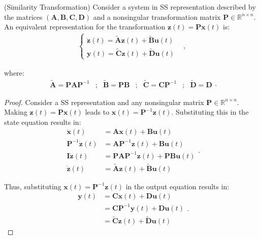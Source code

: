 \documentclass[a4paper,11pt]{book}
\numberwithin{figure}{chapter}
\numberwithin{equation}{chapter}
\numberwithin{table}{chapter}
\newtheorem{theorem}{Theorem}[chapter]
\theoremstyle{definition}
\newcounter{boxed-theorem}
\newenvironment{boxed-theorem}[1]
{\colorlet{shadecolor}{pastelBlue2!5} \begin{shaded} \begin{theorem}{#1}}
{\end{theorem} \end{shaded}}
\newcounter{boxed-lemma}
\newcounter{boxed-definition}
\newcounter{boxed-example}
\begin{document}
\begin{boxed-theorem}{(Similarity Transformation)}
    Consider a system in SS representation described by the matrices $(\bm{A}, \bm{B}, \bm{C}, \bm{D})$ and a nonsingular transformation matrix $\bm{P} \in \mathbb{R}^{n \times n}$. An equivalent representation for the transformation $\bm{z}(t) = \bm{P} \bm{x}(t)$ is:
    \begin{align}
    \begin{cases}
        \dot{\bm{z}}(t) = \tilde{\bm{A}} \bm{z}(t) + \tilde{\bm{B}} \bm{u}(t) & \\
        \bm{y}(t) = \tilde{\bm{C}} \bm{z}(t) + \tilde{\bm{D}} \bm{u}(t)
    \end{cases} 
    ,\end{align}
    
    \noindent where:
    \begin{equation}
        \begin{matrix}
            \tilde{\bm{A}} = \bm{P} \bm{A} \bm{P}^{-1} &; & \tilde{\bm{B}} = \bm{P} \bm{B} &; & \tilde{\bm{C}} = \bm{C} \bm{P}^{-1} &; & \tilde{\bm{D}} = \bm{D}
        \end{matrix}
    .\end{equation}
\end{boxed-theorem}

\begin{proof}
    Consider a SS representation and any nonsingular matrix $\bm{P} \in \mathbb{R}^{n \times n}$. Making $\bm{z}(t) = \bm{P} \bm{x}(t)$ leads to $\bm{x}(t) = \bm{P}^{-1} \bm{z}(t)$. Substituting this in the state equation results in:
    \begin{equation}
    \begin{split}
        \dot{\bm{x}}(t) &= \bm{A} \bm{x}(t) + \bm{B} \bm{u}(t) \\
        \bm{P}^{-1} \dot{\bm{z}}(t) &= \bm{A} \bm{P}^{-1} \bm{z}(t) + \bm{B} \bm{u}(t) \\
        \bm{I} \dot{\bm{z}}(t) &= \bm{P} \bm{A} \bm{P}^{-1} \bm{z}(t) + \bm{P} \bm{B} \bm{u}(t) \\
        \dot{\bm{z}}(t) &= \tilde{\bm{A}} \bm{z}(t) + \tilde{\bm{B}} \bm{u}(t)
    \end{split}
    .\end{equation}
    
    Thus, substituting $\bm{x}(t) = \bm{P}^{-1} \bm{z}(t)$ in the output equation results in:
    \begin{equation}
    \begin{split}
        \bm{y}(t) &= \bm{C} \bm{x}(t) + \bm{D} \bm{u}(t) \\
        	&= \bm{C} \bm{P}^{-1} \bm{y}(t) + \bm{D} \bm{u}(t) \\
        	&= \tilde{\bm{C}} \bm{z}(t) + \tilde{\bm{D}} \bm{u}(t)
    \end{split}
    .\end{equation}
\end{proof}
\end{document}
